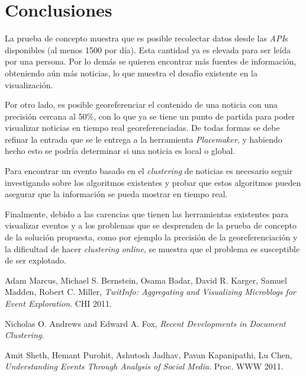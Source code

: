 \documentclass[10pt]{article}
\begin{document}
\section{Conclusiones}

La prueba de concepto muestra que es posible recolectar datos desde las \emph{API}s disponibles (al menos 1500 por día). Esta cantidad ya es elevada para ser leída por una persona. Por lo demás se quieren encontrar más fuentes de información, obteniendo aún más noticias, lo que muestra el desafío existente en la visualización. 

Por otro lado, es posible georeferenciar el contenido de una noticia con una precisión cercana al 50\%, con lo que ya se tiene un punto de partida para poder visualizar noticias en tiempo real georeferenciadas. De todas formas se debe refinar la entrada que se le entrega a la herramienta \emph{Placemaker}, y habiendo hecho esto se podría determinar si una noticia es local o global.

Para encontrar un evento basado en el \emph{clustering} de noticias es necesario seguir investigando sobre los algoritmos existentes y probar que estos algoritmos pueden asegurar que la información se pueda mostrar en tiempo real.

Finalmente, debido a las carencias que tienen las herramientas existentes para visualizar eventos y a los problemas que se desprenden de la prueba de concepto de la solución propuesta, como por ejemplo la precisión de la georeferenciación y la dificultad de hacer \emph{clustering online}, se muestra que el problema es susceptible de ser explotado.

\newpage


\begin{thebibliography}{9}

Adam Marcus, Michael S. Bernstein, Osama Badar, David R. Karger, Samuel Madden, Robert C. Miller,
\emph{TwitInfo: Aggregating and Visualizing Microblogs for Event Exploration}.
CHI 2011.

Nicholas O. Andrews and Edward A. Fox,
\emph{Recent Developments in Document Clustering}.

Amit Sheth, Hemant Purohit, Ashutosh Jadhav, Pavan Kapanipathi, Lu Chen,
\emph{Understanding Events Through Analysis of Social Media}.
Proc. WWW 2011.


\end{thebibliography}
\end{document}
